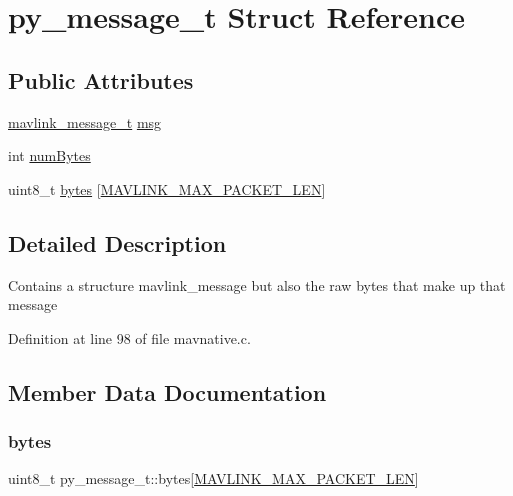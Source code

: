 \hypertarget{structpy__message__t}{}\section{py\+\_\+message\+\_\+t Struct Reference}
\label{structpy__message__t}
\subsection*{Public Attributes}
\begin{DoxyCompactItemize}
\item 
\mbox{\hyperlink{include__v0_89_2mavlink__types_8h_a63b963764c09dc72f4910c1521e325b9}{mavlink\+\_\+message\+\_\+t}} \mbox{\hyperlink{structpy__message__t_ad25d53a85d0e174aa674ecaaad2d82e6}{msg}}
\item 
int \mbox{\hyperlink{structpy__message__t_a524ff7982e9326e6a1560f93b9aa325d}{num\+Bytes}}
\item 
uint8\+\_\+t \mbox{\hyperlink{structpy__message__t_ae580fbe98beb54e856e0a7b32e4deb5b}{bytes}} \mbox{[}\mbox{\hyperlink{include__v2_80_2mavlink__types_8h_a473ed646f44ca10001777e8f150508a6}{M\+A\+V\+L\+I\+N\+K\+\_\+\+M\+A\+X\+\_\+\+P\+A\+C\+K\+E\+T\+\_\+\+L\+EN}}\mbox{]}
\end{DoxyCompactItemize}


\subsection{Detailed Description}
Contains a structure mavlink\+\_\+message but also the raw bytes that make up that message 

Definition at line 98 of file mavnative.\+c.



\subsection{Member Data Documentation}
\mbox{\label{structpy__message__t_ae580fbe98beb54e856e0a7b32e4deb5b}} 
\subsubsection{\texorpdfstring{bytes}{bytes}}
{\footnotesize\ttfamily uint8\+\_\+t py\+\_\+message\+\_\+t\+::bytes\mbox{[}\mbox{\hyperlink{include__v2_80_2mavlink__types_8h_a473ed646f44ca10001777e8f150508a6}{M\+A\+V\+L\+I\+N\+K\+\_\+\+M\+A\+X\+\_\+\+P\+A\+C\+K\+E\+T\+\_\+\+L\+EN}}\mbox{]}}



